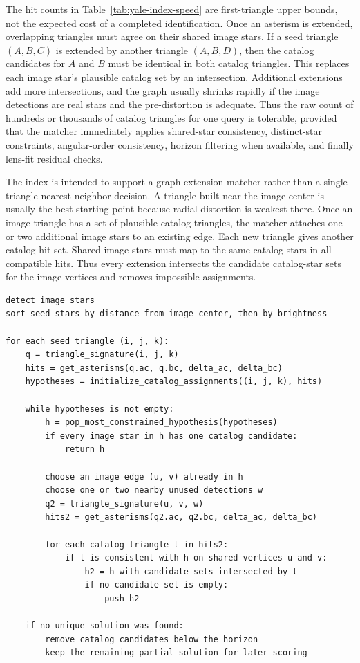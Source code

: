\documentclass[11pt]{article}
\begin{document}
The hit counts in Table~\ref{tab:yale-index-speed} are first-triangle upper
bounds, not the expected cost of a completed identification. Once an asterism
is extended, overlapping triangles must agree on their shared image stars. If a
seed triangle \((A,B,C)\) is extended by another triangle \((A,B,D)\), then
the catalog candidates for \(A\) and \(B\) must be identical in both catalog
triangles. This replaces each image star's plausible catalog set by an
intersection. Additional extensions add more intersections, and the graph
usually shrinks rapidly if the image detections are real stars and the
pre-distortion is adequate. Thus the raw count of hundreds or thousands of
catalog triangles for one query is tolerable, provided that the matcher
immediately applies shared-star consistency, distinct-star constraints,
angular-order consistency, horizon filtering when available, and finally
lens-fit residual checks.

The index is intended to support a graph-extension matcher rather than a
single-triangle nearest-neighbor decision. A triangle built near the image
center is usually the best starting point because radial distortion is weakest
there. Once an image triangle has a set of plausible catalog triangles, the
matcher attaches one or two additional image stars to an existing edge. Each
new triangle gives another catalog-hit set. Shared image stars must map to the
same catalog stars in all compatible hits. Thus every extension intersects the
candidate catalog-star sets for the image vertices and removes impossible
assignments.

\begin{lstlisting}[language={},caption={Sketch of a triangle-graph extension matcher.}]
detect image stars
sort seed stars by distance from image center, then by brightness

for each seed triangle (i, j, k):
    q = triangle_signature(i, j, k)
    hits = get_asterisms(q.ac, q.bc, delta_ac, delta_bc)
    hypotheses = initialize_catalog_assignments((i, j, k), hits)

    while hypotheses is not empty:
        h = pop_most_constrained_hypothesis(hypotheses)
        if every image star in h has one catalog candidate:
            return h

        choose an image edge (u, v) already in h
        choose one or two nearby unused detections w
        q2 = triangle_signature(u, v, w)
        hits2 = get_asterisms(q2.ac, q2.bc, delta_ac, delta_bc)

        for each catalog triangle t in hits2:
            if t is consistent with h on shared vertices u and v:
                h2 = h with candidate sets intersected by t
                if no candidate set is empty:
                    push h2

    if no unique solution was found:
        remove catalog candidates below the horizon
        keep the remaining partial solution for later scoring
\end{lstlisting}
\end{document}
